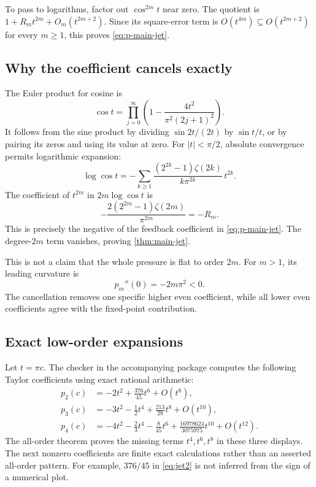 \documentclass[11pt,a4paper]{article}
\numberwithin{equation}{section}
\theoremstyle{definition}
\theoremstyle{remark}
\begin{document}
To pass to logarithms, factor out $\cos^{2m}t$ near zero. The quotient
is $1+R_mt^{2m}+O_m(t^{2m+2})$. Since its square-error term is
$O(t^{4m})\subseteq O(t^{2m+2})$ for every $m\geq1$, this proves
\cref{eq:p-main-jet}.

\subsection{Why the coefficient cancels exactly}
The Euler product for cosine is
\[
 \cos t=\prod_{j=0}^\infty
 \left(1-\frac{4t^2}{\pi^2(2j+1)^2}\right).
\]
It follows from the sine product by dividing $\sin2t/(2t)$ by
$\sin t/t$, or by pairing its zeros and using its value at zero.
For $|t|<\pi/2$, absolute convergence permits logarithmic expansion:
\begin{equation}
 \log\cos t
 =-\sum_{k\geq1}
 \frac{(2^{2k}-1)\zeta(2k)}{k\pi^{2k}}\,t^{2k}.
 \label{eq:logcos}
\end{equation}
The coefficient of $t^{2m}$ in $2m\log\cos t$ is
\[
 -\frac{2(2^{2m}-1)\zeta(2m)}{\pi^{2m}}=-R_m.
\]
This is precisely the negative of the feedback coefficient in
\cref{eq:p-main-jet}. The degree-$2m$ term vanishes, proving
\cref{thm:main-jet}.

This is not a claim that the whole pressure is flat to order $2m$.
For $m>1$, its leading curvature is
\begin{equation}
 p_m''(0)=-2m\pi^2<0.
 \label{eq:curvature}
\end{equation}
The cancellation removes one specific higher even coefficient, while
all lower even coefficients agree with the fixed-point contribution.

\subsection{Exact low-order expansions}
Let $t=\pi c$. The checker in the accompanying package computes the
following Taylor coefficients using exact rational arithmetic:
\begin{align}
 p_2(c)&=-2t^2+\frac{376}{45}t^6+O(t^8),
 \label{eq:jet2}\\
 p_3(c)&=-3t^2-\frac12t^4+\frac{213}{28}t^8+O(t^{10}),
 \label{eq:jet3}\\
 p_4(c)&=-4t^2-\frac23t^4-\frac8{45}t^6
 +\frac{16978624}{3075975}t^{10}+O(t^{12}).
 \label{eq:jet4}
\end{align}
The all-order theorem proves the missing terms $t^4,t^6,t^8$ in these
three displays. The next nonzero coefficients are finite exact
calculations rather than an asserted all-order pattern. For example,
$376/45$ in \cref{eq:jet2} is not inferred from the sign of a numerical
plot.
\end{document}
